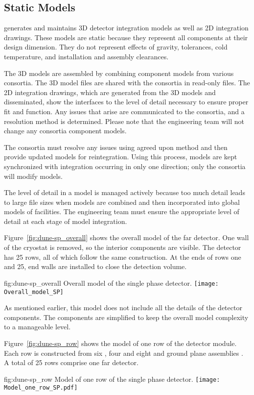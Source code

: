 \subsection{Static Models}
\label{sec:fdsp-coord-integ-static}
 generates and maintains
3D detector integration models as well as
2D integration drawings. These models are static because they represent all
components at their design dimension. They do not represent effects of
gravity, tolerances, cold temperature, and installation and assembly
clearances.


The 3D models are assembled by combining component models from various
consortia. The 3D model files are shared with the consortia in read-only files. The 2D integration drawings, which are generated from the 3D models and disseminated, show the interfaces to the level of detail 
necessary to ensure proper fit and function. Any issues that arise are
communicated to the consortia, and a resolution method is
determined. Please note that the  engineering team
will not change any consortia component models.


The consortia must resolve any issues using
agreed upon method and then provide updated models for reintegration. Using this process, models are kept synchronized with integration occurring in only one direction; only the consortia will modify models.


The level of detail in a model is managed actively because too much detail leads to large file sizes when models are combined and
then incorporated into global models of facilities. The  engineering team must ensure the
appropriate level of detail at each stage of model
integration.


Figure~\ref{fig:dune-sp_overall} shows the overall model of the far detector. One wall of the cryostat is removed, so the interior
components are visible. The detector has 25 rows, all of which follow
the same construction. At the ends of rows one and 25, end
walls are installed to close the detection volume.
\begin{dunefigure}{fig:dune-sp_overall}
  {Overall model of the single phase detector.}
  \texttt{[image: Overall\_model\_SP]}
\end{dunefigure}
As mentioned earlier, this model does not include all the details of
the detector components. The components are simplified to keep the
overall model complexity to a manageable level.


Figure~\ref{fig:dune-sp_row} shows the model of one row of the
detector module. Each row is constructed from six ,
four  and eight  and ground plane
assemblies  . A total of 25 rows comprise one  far detector.
\begin{dunefigure}{fig:dune-sp_row}
  {Model of one row of the single phase detector.}
  \texttt{[image: Model\_one\_row\_SP.pdf]}
\end{dunefigure}




